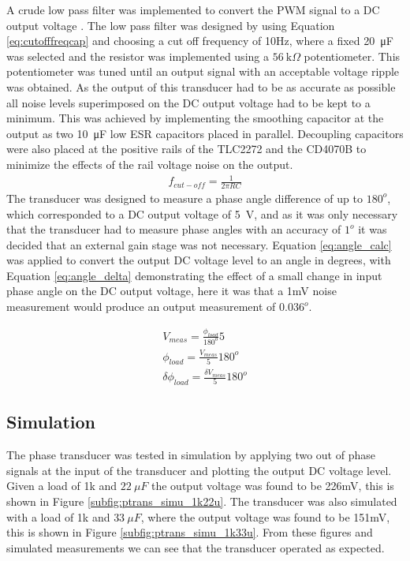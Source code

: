A crude low pass filter was implemented to convert the PWM signal to a DC output voltage \cite{PWMref}. The low pass filter was designed by using Equation \ref{eq:cutofffreqcap} and choosing a cut off frequency of 10Hz, where a fixed \SI{20}{\micro F} was selected and the resistor was implemented using a $\SI{56}{\kilo \Omega}$ potentiometer. This potentiometer was tuned until an output signal with an acceptable voltage ripple was obtained. As the output of this transducer had to be as accurate as possible all noise levels superimposed on the DC output voltage had to be kept to a minimum. This was achieved by implementing the smoothing capacitor at the output as two \SI{10}{\micro F} low ESR capacitors placed in parallel. Decoupling capacitors were also placed at the positive rails of the TLC2272 and the CD4070B to minimize the effects of the rail voltage noise on the output.
\begin{align}
    f_{cut-off}=\frac{1}{2\pi RC} 
   \label{eq:cutofffreqcap}
\end{align}
The transducer was designed to measure a phase angle difference of up to $180^o$, which corresponded to a DC output voltage of \SI{5}{\volt}, and as it was only necessary that the transducer had to measure phase angles with an accuracy of $1^o$ it was decided that an external gain stage was not necessary. %
Equation \ref{eq:angle_calc} was applied to convert the output DC voltage level to an angle in degrees, with Equation \ref{eq:angle_delta} demonstrating the effect of a small change in input phase angle on the DC output voltage, here it was that a 1mV noise measurement would produce an output measurement of $0.036^o$.

\begin{align}
    V_{meas} =\frac{\phi_{load}}{180^o} 5 \nonumber \\
    \phi_{load} =\frac{V_{meas}}{5} 180^o \label{eq:angle_calc} \\
    \delta \phi_{load} =\frac{\delta V_{meas}}{5} 180^o \label{eq:angle_delta}
\end{align}

\subsection{Simulation} \label{sec:ptrans_simu}
The phase transducer was tested in simulation by applying two out of phase signals at the input of the transducer and plotting the output DC voltage level. Given a load of 1k and $\SI{22}{\mu F}$ the output voltage was found to be 226mV, this is shown in Figure \ref{subfig:ptrans_simu_1k22u}. The transducer was also simulated with a load of 1k and $\SI{33}{\mu F}$, where the output voltage was found to be 151mV, this is shown in Figure \ref{subfig:ptrans_simu_1k33u}. From these figures and simulated measurements we can see that the transducer operated as expected.

